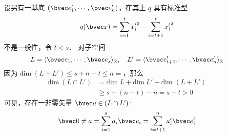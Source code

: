 设另有一基底 $(\bvec e'_1,\cdots,\bvec e'_n)$，在其上 $q$ 具有标准型
\begin{equation}
q(\bvec x)=\sum_{i=1}^{t}{x'_i}^2-\sum_{i=t+1}^{r} {x'_{i}}^{2}
\end{equation}
不是一般性，令 $t<s$．
对子空间
\begin{equation}
L=\langle \bvec e_1,\cdots,\bvec e_s\rangle_\mathbb{R},\quad L'=\langle \bvec e'_{t+1},\cdots,\bvec e'_n\rangle_\mathbb{R}
\end{equation}
因为 $\mathrm{dim}\;(L+L')\leq s+n-t\leq n=$，那么
\begin{equation}
\begin{aligned}
\mathrm{dim}\;(L\cap L')&=\mathrm{dim}\; L+\mathrm{dim}\; L'-\mathrm{dim}\;(L+L')\\
&\geq s+(n-t)-n=s-t> 0
\end{aligned}
\end{equation}
可见，存在一非零矢量 $\bvec a\in(L\cap L')$:
\begin{equation}
\bvec 0\neq a=\sum_{i=1}^s a_i\bvec e_i=\sum_{i=t+1}^n a'_i \bvec e'_i
\end{equation}
